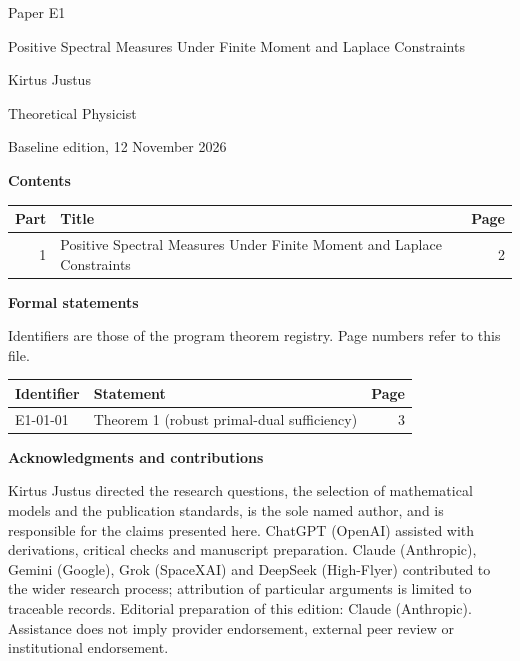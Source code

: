\documentclass[11pt,a4paper]{article}
\begin{document}
\thispagestyle{empty}\pagestyle{empty}
{\small\sffamily \ProgramTitle\hfill Paper E1\par}
\vspace*{12mm}
{\LARGE\bfseries\raggedright{} Positive Spectral Measures Under Finite Moment and Laplace Constraints\par}
\vspace{9mm}
{\large Kirtus Justus\par}\vspace{1mm}Theoretical Physicist\par\AuthorLocation\par\vspace{2mm}Baseline edition, 12 November 2026\par\vspace{8mm}
\textbf{Contents}\par\vspace{1mm}
{\small\begin{longtable}{@{}r>{\raggedright\arraybackslash}p{}r@{}}
\toprule Part & Title & Page\\\midrule\endhead
1 & Positive Spectral Measures Under Finite Moment and Laplace Constraints & 2\\
\bottomrule\end{longtable}}
\vspace{2mm}\textbf{Formal statements}\par\vspace{1mm}
{\footnotesize Identifiers are those of the program theorem registry. Page numbers refer to this file.\par}
{\footnotesize\begin{longtable}{@{}l>{\raggedright\arraybackslash}p{}r@{}}
\toprule Identifier & Statement & Page\\\midrule\endhead
E1-01-01 & Theorem 1 (robust primal-dual sufficiency) & 3\\
\bottomrule\end{longtable}}
\vspace{3mm}\textbf{Acknowledgments and contributions}\par
{\small Kirtus Justus directed the research questions, the selection of mathematical models and the publication standards, is the sole named author, and is responsible for the claims presented here. ChatGPT (OpenAI) assisted with derivations, critical checks and manuscript preparation. Claude (Anthropic), Gemini (Google), Grok (SpaceXAI) and DeepSeek (High-Flyer) contributed to the wider research process; attribution of particular arguments is limited to traceable records. Editorial preparation of this edition: Claude (Anthropic). Assistance does not imply provider endorsement, external peer review or institutional endorsement.\par}
\end{document}
